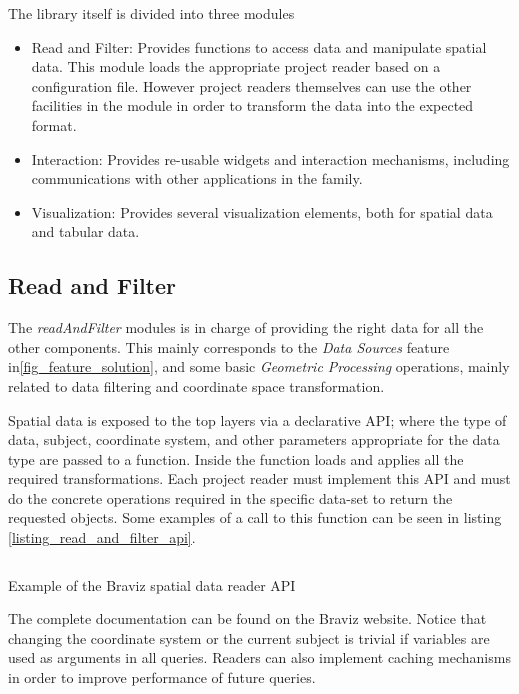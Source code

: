 The library itself is divided into three modules

\begin{itemize}
	\item Read and Filter: Provides functions to access data and manipulate spatial data. This module loads the appropriate project reader based on a configuration file. However project readers themselves can use the other facilities in the module in order to transform the data into the expected format.
	\item Interaction: Provides re-usable widgets and interaction mechanisms, including communications with other applications in the family.
	\item Visualization: Provides several visualization elements, both for spatial data and tabular data.
\end{itemize}



\subsection{Read and Filter}

The \emph{readAndFilter} modules is in charge of providing the right data for all the other components. This mainly corresponds to the \emph{Data Sources} feature in\ref{fig_feature_solution}, and some basic \emph{Geometric Processing} operations, mainly related to data filtering and coordinate space transformation.

Spatial data is exposed to the top layers via a declarative API; where the type of data, subject, coordinate system, and other parameters appropriate for the data type are passed to a function. Inside the function loads and applies all the required transformations. Each project reader must implement this API and must do the concrete operations required in the specific data-set to return the requested objects. Some examples of a call to this function can be seen in listing \ref{listing_read_and_filter_api}.

\begin{listing}
\inputminted{python}{code/read_and_filter_1.py}
\caption{Example of the Braviz spatial data reader API}
\label{listing_read_and_filter_api}
\end{listing}

The complete documentation can be found on the Braviz website. Notice that changing the coordinate system or the current subject is trivial if variables are used as arguments in all queries. Readers can also implement caching mechanisms in order to improve performance of future queries.


